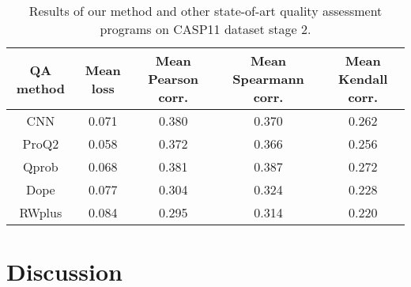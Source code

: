 \documentclass[a4paper,10pt]{article}
\begin{document}
\begin{table}[H]
\begin{center}
\begin{tabular}{ c | c | c | c | c }
    
    QA method & Mean loss & Mean Pearson corr. & Mean Spearmann corr. & Mean Kendall corr. \\
    \hline
    CNN     &0.071 &0.380 &0.370 &0.262 \\ \hline
    ProQ2   &0.058 &0.372 &0.366 &0.256 \\ \hline
    Qprob   &0.068 &0.381 &0.387 &0.272 \\ \hline
    Dope    &0.077 &0.304 &0.324 &0.228 \\ \hline
    RWplus  &0.084 &0.295 &0.314 &0.220 \\ \hline
\end{tabular}
    
    \caption {Results of our method and other state-of-art quality assessment programs on CASP11 dataset stage 2.}
    \label{Tbl:optParams}
\end{center}
\end{table}


\section{Discussion}

{}

\end{document}

